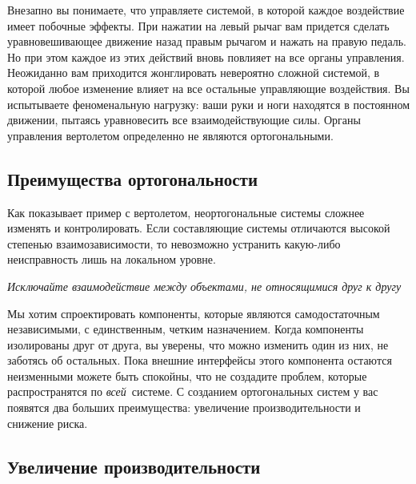 Внезапно вы понимаете, что
управляете системой, в которой каждое воздействие имеет побочные эффекты. При
нажатии на левый рычаг вам придется сделать уравновешивающее движение назад
правым рычагом и нажать на правую педаль. Но при этом каждое из этих действий
вновь повлияет на все органы управления. Неожиданно вам приходится жонглировать
невероятно сложной системой, в которой любое изменение влияет на все остальные
управляющие воздействия. Вы испытываете феноменальную нагрузку: ваши руки и ноги
находятся в постоянном движении, пытаясь уравновесить все взаимодействующие
силы. Органы управления вертолетом определенно не являются ортогональными.

\subsection{Преимущества ортогональности}

Как показывает пример с вертолетом, неортогональные системы сложнее изменять и
контролировать. Если составляющие системы отличаются высокой степенью
взаимозависимости, то невозможно устранить какую-либо неисправность лишь на
локальном уровне.

\bigskip
\emph{Исключайте взаимодействие между объектами, не относящимися друг к другу}
\bigskip

Мы хотим спроектировать компоненты, которые являются самодостаточным
независимыми, с единственным, четким назначением. Когда компоненты изолированы
друг от друга, вы уверены, что можно изменить один из них, не заботясь об
остальных. Пока внешние интерфейсы этого компонента остаются неизменными можете
быть спокойны, что не создадите проблем, которые распространятся по
\emph{всей}\ системе. С созданием ортогональных систем у вас появятся два
больших преимущества: увеличение производительности и снижение риска.

\subsection{Увеличение производительности}

